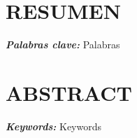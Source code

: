         \providecommand{\palabrasclave}[1]
        {
          \small	
          \textbf{\textit{Palabras clave:}} #1
        }   
        \providecommand{\keywords}[1]
        {
          \small	
          \textbf{\textit{Keywords:}} #1
        }

\chapter*{RESUMEN}
    
    \palabrasclave{Palabras}
\chapter*{ABSTRACT}
    
    \keywords{Keywords}
